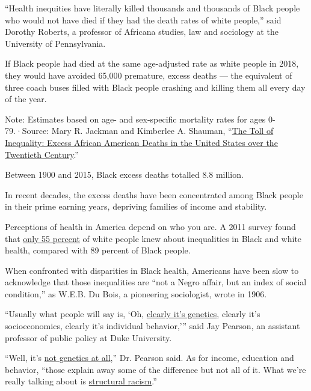 ``Health inequities have literally killed thousands and thousands of
Black people who would not have died if they had the death rates of
white people,'' said Dorothy Roberts, a professor of Africana studies,
law and sociology at the University of Pennsylvania.

If Black people had died at the same age-adjusted rate as white people
in 2018, they would have avoided 65,000 premature, excess deaths --- the
equivalent of three coach buses filled with Black people crashing and
killing them all every day of the year.

Note: Estimates based on age- and sex-specific mortality rates for ages
0-79.·Source: Mary R. Jackman and Kimberlee A. Shauman,
``\href{https://www.cambridge.org/core/services/aop-cambridge-core/content/view/9F0994F128271F21B04749C1E8D905C1/S1742058X20000028a.pdf/toll_of_inequality.pdf}{The
Toll of Inequality: Excess African American Deaths in the United States
over the Twentieth Century}.''

Between 1900 and 2015, Black excess deaths totalled 8.8 million.

In recent decades, the excess deaths have been concentrated among Black
people in their prime earning years, depriving families of income and
stability.

Perceptions of health in America depend on who you are. A 2011 survey
found that
\href{https://www.healthaffairs.org/doi/full/10.1377/hlthaff.2010.0702}{only
55 percent} of white people knew about inequalities in Black and white
health, compared with 89 percent of Black people.

When confronted with disparities in Black health, Americans have been
slow to acknowledge that those inequalities are ``not a Negro affair,
but an index of social condition,'' as W.E.B. Du Bois, a pioneering
sociologist, wrote in 1906.

``Usually what people will say is, `Oh,
\href{https://www.healthaffairs.org/do/10.1377/hblog20200630.939347/full/}{clearly
it's genetics}, clearly it's socioeconomics, clearly it's individual
behavior,''' said Jay Pearson, an assistant professor of public policy
at Duke University.

``Well, it's \href{https://thenewpress.com/books/fatal-invention}{not
genetics at all},'' Dr. Pearson said. As for income, education and
behavior, ``those explain away some of the difference but not all of it.
What we're really talking about is
\href{https://pdfs.semanticscholar.org/14f1/6214e22d273fd9f9d8490a7c0c4171eebb41.pdf}{structural
racism}.''

